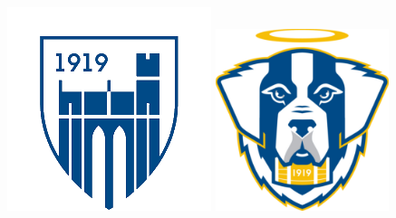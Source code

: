 \documentclass[letterpaper,]{article}
\begin{document}
\begin{center} 
    \href{https://www.emmanuel.edu/academics/academic-study/schools/school-business-management/undergraduate-programs/economics/finance}{\includegraphics[scale=0.18]{emmanuel_badge_transparent.png}}
    \href{https://www.goecsaints.com/sports/m-volley/2023-24/roster?fbclid=IwZXh0bgNhZW0CMTAAAR1BNVivBPFXwbOnF0Or9-soHdK9oZpkIlVMOkQCKcvJAdITIKqFqxbJQVs_aem_AWWyeZeu-n9J8rkD5-lNwZaIXUJtoKfKY4K3m-vu2l1DcCKM-mdDvC9JsHp7QImKCABa0u0L1RcDO4bvdM66DGxy}{\includegraphics[scale=0.18]{Emmanuel_mascot_logo.png}}
\end{center}
\end{document}
